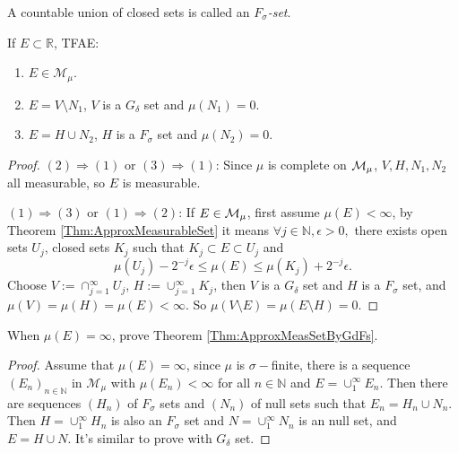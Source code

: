 \begin{defn}
    A countable union of closed sets is called an 
    \textit{$F_{\sigma}$-set}.
\end{defn}
\begin{thm}
    \label{Thm:ApproxMeasSetByGdFs}
    If $E\subset\mathbb{R}$, TFAE:
    \begin{enumerate}
        \item $E\in\mathcal{M}_{\mu}$.
        \item $E=V\setminus N_1$, $V$ is a $G_{\delta}$ set and 
        $\mu(N_1)=0$.
        \item $E=H\cup N_2$, $H$ is a $F_{\sigma}$ set and 
        $\mu(N_2)=0$.
    \end{enumerate}
\end{thm}
\begin{proof}
    $(2)\Rightarrow(1)$ or $(3)\Rightarrow(1)$: Since $\mu$ 
    is complete on $\mathcal{M}_{\mu}$, $V,H,N_1,N_2$ all measurable, 
    so $E$ is measurable.

    $(1)\Rightarrow(3)$ or $(1)\Rightarrow(2)$: If $E\in\mathcal{M}_{\mu}$, 
    first assume $\mu(E)<\infty$, 
    by Theorem \ref{Thm:ApproxMeasurableSet}
    it means $\forall j\in\mathbb{N},\epsilon>0,$ 
    there exists open sets $U_{j}$, closed sets $K_{j}$ such that 
    $K_j\subset E\subset U_j$ and 
    \begin{displaymath}
        \mu(U_j)-2^{-j}\epsilon\le\mu(E)\le\mu(K_{j})+2^{-j}\epsilon.
    \end{displaymath}
    Choose $V:=\cap_{j=1}^{\infty}U_{j}$, $H:=\cup_{j=1}^{\infty}K_j$, 
    then $V$ is a $G_{\delta}$ set and 
    $H$ is a $F_{\sigma}$ set, and 
    $\mu(V)=\mu(H)=\mu(E)<\infty$. So 
    $\mu(V\setminus E)=\mu(E\setminus H)=0$.
\end{proof}
\begin{exc}
    When $\mu(E)=\infty$, prove Theorem \ref{Thm:ApproxMeasSetByGdFs}.
\end{exc}
\begin{proof}
    Assume that $\mu(E)=\infty$, since $\mu$ is $\sigma-$finite, there
    is a sequence $(E_n)_{n\in\mathbb{N}}$ in $\mathcal{M}_{\mu}$ with 
    $\mu(E_n)<\infty$ for all $n\in\mathbb{N}$ and $E=\cup_{1}^{\infty}E_n$.
    Then there are sequences $(H_n)$ of $F_{\sigma}$ sets and $(N_n)$ of 
    null sets such that $E_n=H_n\cup N_n$. Then $H=\cup_{1}^{\infty}H_n$
    is also an $F_{\sigma}$ set and $N=\cup_{1}^{\infty}N_n$ is an null set,
    and $E=H\cup N$. It's similar to prove with $G_{\delta}$ set.
\end{proof}
